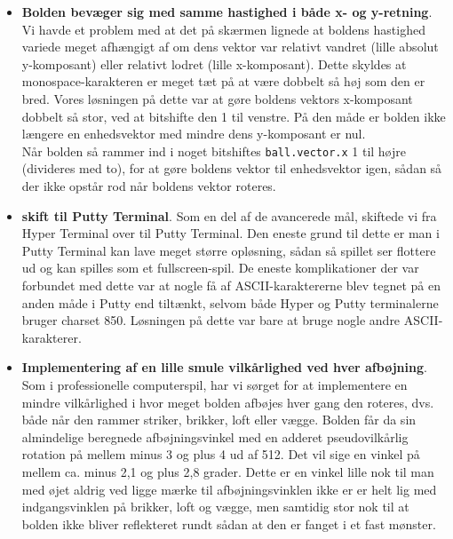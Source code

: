 \begin{itemize}
\item \textbf{Bolden bevæger sig med samme hastighed i både x- og y-retning}. Vi havde et problem med at det på skærmen lignede at boldens hastighed variede meget afhængigt af om dens vektor var relativt vandret (lille absolut y-komposant) eller relativt lodret (lille x-komposant). Dette skyldes at monospace-karakteren er meget tæt på at være dobbelt så høj som den er bred. Vores løsningen på dette var at gøre boldens vektors x-komposant dobbelt så stor, ved at bitshifte den 1 til venstre. På den måde er bolden ikke længere en enhedsvektor med mindre dens y-komposant er nul.\\
Når bolden så rammer ind i noget bitshiftes \texttt{ball.vector.x} 1 til højre (divideres med to), for at gøre boldens vektor til enhedsvektor igen, sådan så der ikke opstår rod når boldens vektor roteres.

\item \textbf{skift til Putty Terminal}. Som en del af de avancerede mål, skiftede vi fra Hyper Terminal over til Putty Terminal. Den eneste grund til dette er man i Putty Terminal kan lave meget større opløsning, sådan så spillet ser flottere ud og kan spilles som et fullscreen-spil. De eneste komplikationer der var forbundet med dette var at nogle få af ASCII-karaktererne blev tegnet på en anden måde i Putty end tiltænkt, selvom både Hyper og Putty terminalerne bruger charset 850. Løsningen på dette var bare at bruge nogle andre ASCII-karakterer.

\item \textbf{Implementering af en lille smule vilkårlighed ved hver afbøjning}. Som i professionelle computerspil, har vi sørget for at implementere en mindre vilkårlighed i hvor meget bolden afbøjes hver gang den roteres, dvs. både når den rammer striker, brikker, loft eller vægge. Bolden får da sin almindelige beregnede afbøjningsvinkel med en adderet pseudovilkårlig rotation på mellem minus 3 og plus 4 ud af 512. Det vil sige en vinkel på mellem ca. minus 2,1 og plus 2,8 grader. Dette er en vinkel lille nok til man med øjet aldrig ved ligge mærke til afbøjningsvinklen ikke er er helt lig med indgangsvinklen på brikker, loft og vægge, men samtidig stor nok til at bolden ikke bliver reflekteret rundt sådan at den er fanget i et fast mønster.


\end{itemize}
